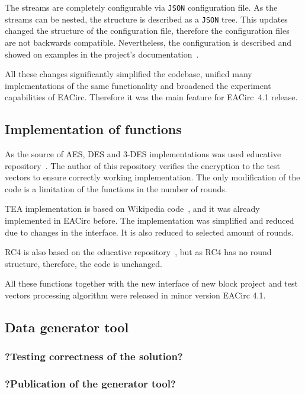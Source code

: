\documentclass[
  print, %
  Table,   %
  nolof,     %
  nolot,     %
  11pt, %
  oneside  %
]{fithesis3}
\begin{document}
The streams are completely configurable via \texttt{JSON} configuration file. As the streams can be nested, the structure is described as a \texttt{JSON} tree. This updates changed the structure of the configuration file, therefore the configuration files are not backwards compatible. Nevertheless, the configuration is described and showed on examples in the project's documentation~\cite{EACirc-wiki-streams}.

All these changes significantly simplified the codebase, unified many implementations of the same functionality and broadened the experiment capabilities of EACirc. Therefore it was the main feature for EACirc~4.1 release.

\subsection{Implementation of functions}
\label{subsec:method-data-funcs}

As the source of AES, DES and 3-DES implementations was used educative repository~\cite{cryptoFunc}. The author of this repository verifies the encryption to the test vectors to ensure correctly working implementation. The only modification of the code is a limitation of the functions in the number of rounds.

TEA implementation is based on Wikipedia code~\cite{teaWiki}, and it was already implemented in EACirc before. The implementation was simplified and reduced due to changes in the interface. It is also reduced to selected amount of rounds.

RC4 is also based on the educative repository~\cite{cryptoFunc}, but as RC4 has no round structure, therefore, the code is unchanged.

All these functions together with the new interface of new block project and test vectors processing algorithm were released in minor version EACirc 4.1.


\subsection{Data generator tool}
\label{subsec:method-data-generator}


\subsubsection{?Testing correctness of the solution?}
\subsubsection{?Publication of the generator tool?}
\end{document}
